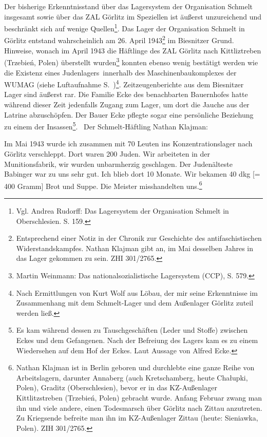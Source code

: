 \newline
Der bisherige Erkenntnisstand über das Lagersystem der Organisation Schmelt insgesamt sowie über das ZAL Görlitz im Speziellen ist äußerst unzureichend und beschränkt sich auf wenige Quellen\footnote{Vgl. Andrea Rudorff: Das Lagersystem der Organisation Schmelt in Oberschlesien. S. 159.}.
Das Lager der Organisation Schmelt in Görlitz entstand wahrscheinlich am 26. April 1943\footnote{Entsprechend einer Notiz in der \glqq Chronik zur Geschichte des antifaschistischen Widerstandskampfes\grqq. Nathan Klajman gibt an, im Mai desselben Jahres in das Lager gekommen zu sein. ZHI 301/2765.} im Biesnitzer Grund. Hinweise, wonach im April 1943 die Häftlinge des ZAL Görlitz nach Kittliztreben (Trzebień, Polen) überstellt wurden\footnote{Martin Weinmann: Das nationalsozialistische Lagersystem (CCP), S. 579.} konnten ebenso wenig bestätigt werden wie die Existenz eines \glqq Judenlagers\grqq~innerhalb des Maschinenbaukomplexes der WUMAG (siehe Luftaufnahme S.~\pageref{maschinenbaufoto})\footnote{Nach Ermittlungen von Kurt Wolf aus Löbau, der mir seine Erkenntnisse im Zusammenhang mit dem Schmelt-Lager und dem Außenlager Görlitz zuteil werden ließ.}.
Zeitzeugenberichte aus dem Biesnitzer Lager sind äußerst rar. Die Familie Ecke des benachbarten Bauernhofes hatte während dieser Zeit jedenfalls Zugang zum Lager, um dort die Jauche aus der Latrine abzuschöpfen. Der Bauer Ecke pflegte sogar eine persönliche Beziehung zu einem der Insassen\footnote{Es kam während dessen zu Tauschgeschäften (Leder und Stoffe) zwischen Eckes und dem Gefangenen. Nach der Befreiung des Lagers kam es zu einem Wiedersehen auf dem Hof der Eckes. Laut Aussage von Alfred Ecke.}.~\newline
Der Schmelt-Häftling Nathan Klajman:
\begin{leftbar}
Im Mai 1943 wurde ich zusammen mit 70 Leuten ins Konzentrationslager nach Görlitz verschleppt. Dort waren 200 Juden. Wir arbeiteten in der Munitionsfabrik, wir wurden unbarmherzig geschlagen. Der Judenälteste Babinger war zu uns sehr gut.
Ich blieb dort 10 Monate. Wir bekamen 40 dkg [= 400 Gramm] Brot und Suppe. Die Meister misshandelten uns.\footnote{Nathan Klajman ist in Berlin geboren und durchlebte eine ganze Reihe von Arbeitslagern, darunter Annaberg (auch \glqq Kretschamberg\grqq, heute Cha\l upki, Polen), Graditz (Oberschlesien), bevor er in das KZ-Außenlager Kittlitzstreben (Trzebień, Polen) gebracht wurde. Anfang Februar zwang man ihn und viele andere, einen Todesmarsch über Görlitz nach Zittau anzutreten. Zu Kriegsende befreite man ihn im KZ-Außenlager Zittau (heute: Sieniawka, Polen). ZIH 301/2765.}
\end{leftbar}
